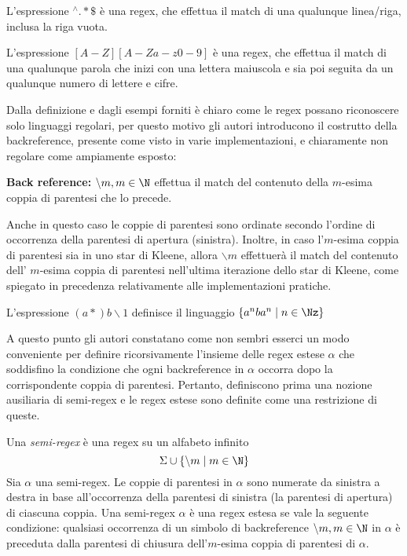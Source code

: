 \begin{esempio}
	L'espressione $^\wedge.*\$$ è una regex, che effettua il match di una qualunque linea/riga, inclusa la riga vuota.
\end{esempio}
\begin{esempio}
	L'espressione $[A-Z][A-Za-z0-9]$ è una regex, che effettua il match di una qualunque parola che inizi con una lettera maiuscola e sia poi seguita da un qualunque numero di lettere e cifre.
\end{esempio}

Dalla definizione e dagli esempi forniti è chiaro come le regex possano riconoscere solo linguaggi regolari, per questo motivo gli autori introducono il costrutto della backreference, presente come visto in varie implementazioni, e chiaramente non regolare come ampiamente esposto:
\begin{definizione}
	\textbf{Back reference:} $\backslash m, m \in \N$ effettua il match del contenuto della $m$-esima coppia di parentesi che lo precede.
\end{definizione}

Anche in questo caso le coppie di parentesi sono ordinate secondo l'ordine di occorrenza della parentesi di apertura (sinistra). Inoltre, in caso l'$m$-esima coppia di parentesi sia in uno star di Kleene, allora $\backslash m$ effettuerà il match del contenuto dell' $m$-esima coppia di parentesi nell'ultima iterazione dello star di Kleene, come spiegato in precedenza relativamente alle implementazioni pratiche.

\begin{esempio}
	L'espressione $(a*)b\backslash 1$ definisce il linguaggio $\{a^nba^n \mid n \in \Nz\}$
\end{esempio}

A questo punto gli autori constatano come non sembri esserci un modo conveniente per definire ricorsivamente l'insieme delle regex estese $\alpha$ che soddisfino la condizione che ogni backreference in $\alpha$ occorra dopo la corrispondente coppia di parentesi. Pertanto, definiscono prima una nozione ausiliaria di semi-regex e le regex estese sono definite come una restrizione di queste.
\begin{definizione}
	Una \textit{semi-regex} è una regex su un alfabeto infinito
	$$\Sigma \cup \{\backslash m \mid m \in \N\}$$
	Sia $\alpha$ una semi-regex. Le coppie di parentesi in $\alpha$ sono numerate da sinistra a destra in base all'occorrenza della parentesi di sinistra (la parentesi di apertura) di ciascuna coppia. Una semi-regex $\alpha$ è una regex estesa se vale la seguente condizione: qualsiasi occorrenza di un simbolo di backreference $\backslash m, m \in \N$ in $\alpha$ è preceduta dalla parentesi di chiusura dell'$m$-esima coppia di parentesi di $\alpha$.
\end{definizione}

